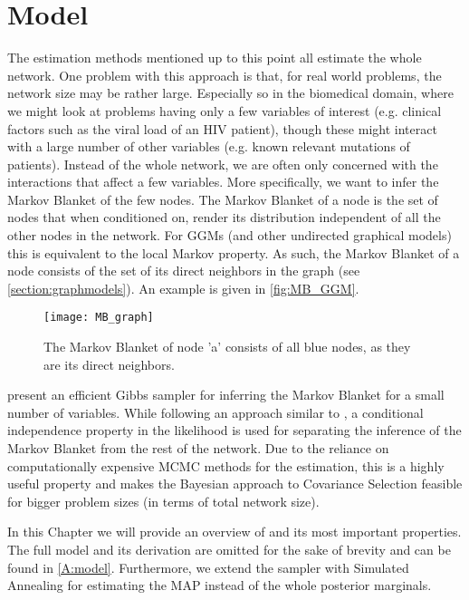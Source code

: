 \chapter{Model}
The estimation methods mentioned up to this point all estimate the whole network. 
One problem with this approach is that, for real world problems, the network size may be rather large. 
Especially so in the biomedical domain, where we might look at problems having only a few variables of interest (e.g. clinical factors such as the viral load of an HIV patient), though these might interact with a large number of other variables (e.g. known relevant mutations of patients). Instead of the whole network, we are often only concerned with the interactions that affect a few variables.
More specifically, we want to infer the Markov Blanket of the few nodes.
The Markov Blanket of a node is the set of nodes that when conditioned on, render its distribution independent of all the other nodes in the network.
For \gls{GGM}s (and other undirected graphical models) this is equivalent to the local Markov property. 
As such, the Markov Blanket of a node consists of the set of its direct neighbors in the graph (see \autoref{section:graphmodels}).
An example is given in \autoref{fig:MB_GGM}.

\begin{figure}[H]
	\centering
	\texttt{[image: MB\_graph]}
	\caption{The Markov Blanket of node 'a' consists of all blue nodes, as they are its direct neighbors.}
	
	\label{fig:MB_GGM}
\end{figure}

\citet{kaufmann_bayesian_2015} present an efficient Gibbs sampler for inferring the Markov Blanket for a small number of variables.
While following an approach similar to \citet{wang_bayesian_2012}, 
a conditional independence property in the likelihood is used for separating the inference of the Markov Blanket from the rest of the network.
Due to the reliance on computationally expensive \gls{MCMC} methods for the estimation, this is a highly useful property and makes the Bayesian approach to Covariance Selection feasible for bigger problem sizes (in terms of total network size).


In this Chapter we will provide an overview of \citet{kaufmann_bayesian_2015} and its most important properties.
The full model and its derivation are omitted for the sake of brevity and can be found in \autoref{A:model}.
Furthermore, we extend the sampler with Simulated Annealing for estimating the MAP instead of the whole posterior marginals.


